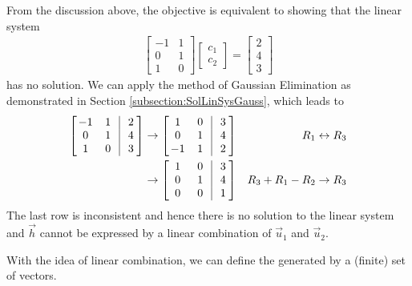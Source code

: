 \begin{solution}
From the discussion above, the objective is equivalent to showing that the linear system
\begin{align*}
\begin{bmatrix}
-1 & 1 \\
0 & 1 \\
1 & 0
\end{bmatrix}
\begin{bmatrix}
c_1 \\
c_2
\end{bmatrix}
=
\begin{bmatrix}
2 \\
4 \\
3
\end{bmatrix}
\end{align*}
has no solution. We can apply the method of Gaussian Elimination as demonstrated in Section \ref{subsection:SolLinSysGauss}, which leads to
\begin{align*}
\left[\begin{array}{@{\;}wc{10pt}wc{10pt}|wc{10pt}@{}}
-1 & 1 & 2\\
0 & 1 & 4\\
1 & 0 & 3
\end{array}\right] 
&\to
\left[\begin{array}{@{\;}wc{10pt}wc{10pt}|wc{10pt}@{}}
1 & 0 & 3 \\
0 & 1 & 4 \\
-1 & 1 & 2
\end{array}\right] & R_1 \leftrightarrow R_3 \\
&\to
\left[\begin{array}{@{\;}wc{10pt}wc{10pt}|wc{10pt}@{}}
1 & 0 & 3 \\
0 & 1 & 4 \\
0 & 0 & 1
\end{array}\right] & R_3 + R_1 - R_2 \to R_3
\end{align*}
The last row is inconsistent and hence there is no solution to the linear system and $\vec{h}$ cannot be expressed by a linear combination of $\vec{u}_1$ and $\vec{u}_2$.
\end{solution}
With the idea of linear combination, we can define the  generated by a (finite) set of vectors.

